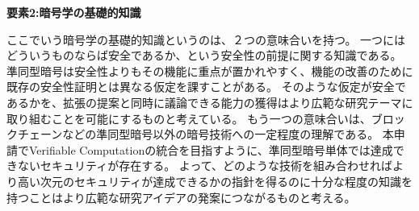 \noindent\textbf{要素2:暗号学の基礎的知識}

ここでいう暗号学の基礎的知識というのは、２つの意味合いを持つ。
一つにはどういうものならば安全であるか、という安全性の前提に関する知識である。
準同型暗号は安全性よりもその機能に重点が置かれやすく、機能の改善のために既存の安全性証明とは異なる仮定を課すことがある。
そのような仮定が安全であるかを、拡張の提案と同時に議論できる能力の獲得はより広範な研究テーマに取り組むことを可能にするものと考えている。
もう一つの意味合いは、ブロックチェーンなどの準同型暗号以外の暗号技術への一定程度の理解である。
本申請でVerifiable Computationの統合を目指すように、準同型暗号単体では達成できないセキュリティが存在する。
よって、どのような技術を組み合わせればより高い次元のセキュリティが達成できるかの指針を得るのに十分な程度の知識を持つことはより広範な研究アイデアの発案につながるものと考える。




